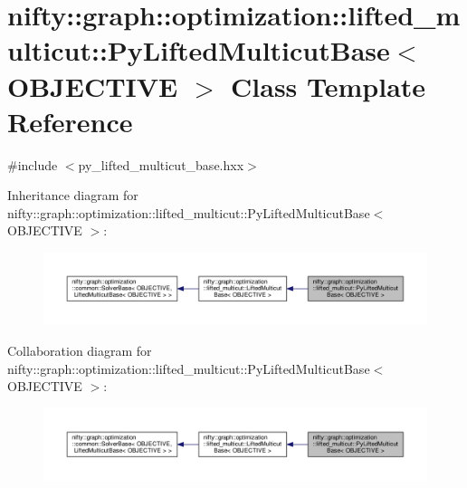 \hypertarget{classnifty_1_1graph_1_1optimization_1_1lifted__multicut_1_1PyLiftedMulticutBase}{}\section{nifty\+:\+:graph\+:\+:optimization\+:\+:lifted\+\_\+multicut\+:\+:Py\+Lifted\+Multicut\+Base$<$ O\+B\+J\+E\+C\+T\+I\+V\+E $>$ Class Template Reference}
\label{classnifty_1_1graph_1_1optimization_1_1lifted__multicut_1_1PyLiftedMulticutBase}


{\ttfamily \#include $<$py\+\_\+lifted\+\_\+multicut\+\_\+base.\+hxx$>$}



Inheritance diagram for nifty\+:\+:graph\+:\+:optimization\+:\+:lifted\+\_\+multicut\+:\+:Py\+Lifted\+Multicut\+Base$<$ O\+B\+J\+E\+C\+T\+I\+V\+E $>$\+:\nopagebreak
\begin{figure}[H]
\begin{center}
\leavevmode
\includegraphics[width=350pt]{classnifty_1_1graph_1_1optimization_1_1lifted__multicut_1_1PyLiftedMulticutBase__inherit__graph}
\end{center}
\end{figure}


Collaboration diagram for nifty\+:\+:graph\+:\+:optimization\+:\+:lifted\+\_\+multicut\+:\+:Py\+Lifted\+Multicut\+Base$<$ O\+B\+J\+E\+C\+T\+I\+V\+E $>$\+:\nopagebreak
\begin{figure}[H]
\begin{center}
\leavevmode
\includegraphics[width=350pt]{classnifty_1_1graph_1_1optimization_1_1lifted__multicut_1_1PyLiftedMulticutBase__coll__graph}
\end{center}
\end{figure}
